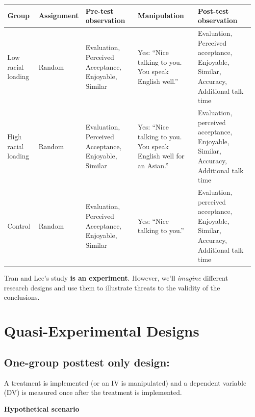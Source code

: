 \documentclass[
  english,
]{book}
\begin{document}
\begin{longtable}[]{@{}
  >{\raggedright\arraybackslash}p{}
  >{\raggedright\arraybackslash}p{}
  >{\raggedright\arraybackslash}p{}
  >{\raggedright\arraybackslash}p{}
  >{\raggedright\arraybackslash}p{}@{}}
\toprule
Group & Assignment & Pre-test observation & Manipulation & Post-test observation \\
\midrule
\endhead
Low racial loading & Random & Evaluation, Perceived Acceptance, Enjoyable, Similar & Yes: ``Nice talking to you. You speak English well.'' & Evaluation, Perceived acceptance, Enjoyable, Similar, Accuracy, Additional talk time \\
High racial loading & Random & Evaluation, Perceived Acceptance, Enjoyable, Similar & Yes: ``Nice talking to you. You speak English well for an Asian.'' & Evaluation, perceived acceptance, Enjoyable, Similar, Accuracy, Additional talk time \\
Control & Random & Evaluation, Perceived Acceptance, Enjoyable, Similar & Yes: ``Nice talking to you.'' & Evaluation, perceived acceptance, Enjoyable, Similar, Accuracy, Additional talk time \\
\bottomrule
\end{longtable}

Tran and Lee's \citeyearpar{tran_you_2014} study \textbf{is an experiment}. However, we'll \emph{imagine} different research designs and use them to illustrate threats to the validity of the conclusions.

\hypertarget{quasi-experimental-designs}{%
\section{Quasi-Experimental Designs}\label{quasi-experimental-designs}}

\hypertarget{one-group-posttest-only-design}{%
\subsection{One-group posttest only design:}\label{one-group-posttest-only-design}}

A treatment is implemented (or an IV is manipulated) and a dependent variable (DV) is measured once after the treatment is implemented.

\textbf{Hypothetical scenario}
\end{document}
